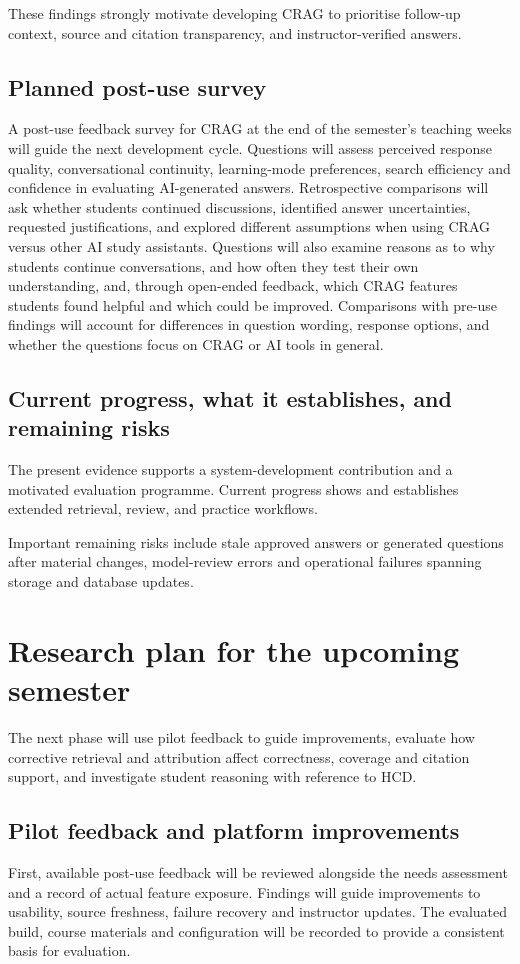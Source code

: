 These findings strongly motivate developing CRAG to prioritise follow-up context, source and citation transparency, and instructor-verified answers.

\section{Planned post-use survey}
A post-use feedback survey for CRAG at the end of the semester's teaching weeks will guide the next development cycle. Questions will assess perceived response quality, conversational continuity, learning-mode preferences, search efficiency and confidence in evaluating AI-generated answers. Retrospective comparisons will ask whether students continued discussions, identified answer uncertainties, requested justifications, and explored different assumptions when using CRAG versus other AI study assistants. Questions will also examine reasons as to why students continue conversations, and how often they test their own understanding, and, through open-ended feedback, which CRAG features students found helpful and which could be improved. Comparisons with pre-use findings will account for differences in question wording, response options, and whether the questions focus on CRAG or AI tools in general.

\section{Current progress, what it establishes, and remaining risks}
The present evidence supports a system-development contribution and a motivated evaluation programme. Current progress shows and establishes extended retrieval, review, and practice workflows.

Important remaining risks include stale approved answers or generated questions after material changes, model-review errors and operational failures spanning storage and database updates.

\chapter{Research plan for the upcoming semester}
The next phase will use pilot feedback to guide improvements, evaluate how corrective retrieval and attribution affect correctness, coverage and citation support, and investigate student reasoning with reference to HCD.

\section{Pilot feedback and platform improvements}
First, available post-use feedback will be reviewed alongside the needs assessment and a record of actual feature exposure. Findings will guide improvements to usability, source freshness, failure recovery and instructor updates. The evaluated build, course materials and configuration will be recorded to provide a consistent basis for evaluation.

